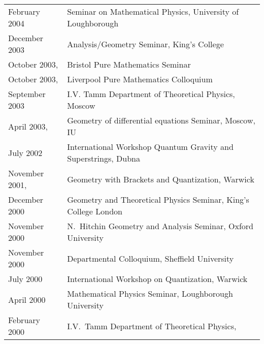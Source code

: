 \documentclass[12pt]{article}
\begin{document}
\begin{tabular}{ll}
 February 2004   &Seminar on Mathematical Physics, University of Loughborough\\

 December 2003   & Analysis/Geometry Seminar, King's College\\
 October 2003,   & Bristol Pure Mathematics Seminar\\
 October 2003,   & Liverpool Pure Mathematics Colloquium\\
 September 2003  & I.V. Tamm Department  of Theoretical Physics, Moscow\\
 April 2003, & Geometry of differential equations Seminar, Moscow, IU\\
 July 2002 & International Workshop Quantum Gravity and Superstrings, Dubna\\
  November 2001, &  Geometry with Brackets and Quantization, Warwick \\
  December 2000 & Geometry and Theoretical Physics Seminar, King's College London\\
  November 2000 & N.~Hitchin Geometry and Analysis Seminar, Oxford University\\
  November 2000    & Departmental Colloquium, Sheffield University \\
 July   2000       & International Workshop on Quantization, Warwick\\
 April  2000      & Mathematical Physics Seminar, Loughborough University \\
 February 2000 & I.V.~Tamm Department of Theoretical
         Physics, \\
\end{tabular}
\end{document}
